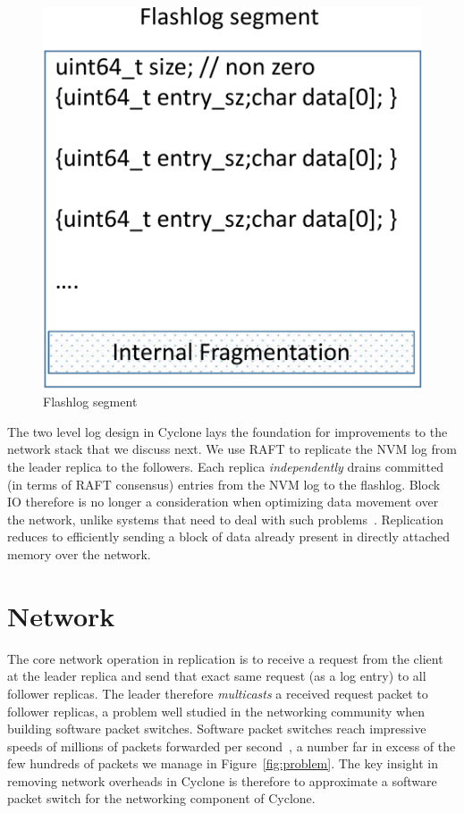 \documentclass[pageno]{jpaper}
\begin{document}
\begin{figure}
  \centering
  \includegraphics[scale=0.4]{figures2/flashlog_page.pdf}
  \caption{Flashlog segment}
  \label{fig:flashlog_page}
\end{figure}

The two level log design in Cyclone lays the foundation for improvements to the
network stack that we discuss next. We use RAFT to replicate the NVM log from
the leader replica to the followers. Each replica \emph{independently} drains
committed (in terms of RAFT consensus) entries from the NVM log to the
flashlog. Block IO therefore is no longer a consideration when optimizing data
movement over the network, unlike systems that need to deal with such
problems~\cite{reflex}. Replication reduces to efficiently sending a block of
data already present in directly attached memory over the network. 

\section{Network}
\label{sec:network}

The core network operation in replication is to receive a request from the
client at the leader replica and send that exact same request (as a log entry)
to all follower replicas. The leader therefore \emph{multicasts} a received
request packet to follower replicas, a problem well studied in the networking
community when building software packet switches. Software packet switches reach
impressive speeds of millions of packets forwarded per second~\cite{dpdk_perf}, a
number far in excess of the few hundreds of packets we manage in
Figure~\ref{fig:problem}. The key insight in removing network overheads in
Cyclone is therefore to approximate a software packet switch for the networking
component of Cyclone.
\end{document}
